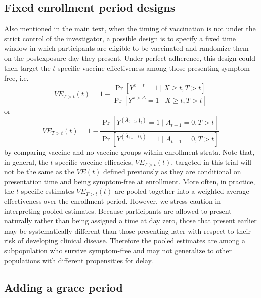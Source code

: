 \begin{appendices}
\begin{refsection}
    \subsection{Fixed enrollment period designs} \label{sec:enrollment}

    Also mentioned in the main text, when the timing of vaccination is not under the strict control of the investigator, a possible design is to specify a fixed time window in which participants are eligible to be vaccinated and randomize them on the postexposure day they present. Under perfect adherence, this design could then target the $t$-specific vaccine effectiveness among those presenting symptom-free, i.e.
    $$
    VE_{T > t}(t) = 1 - \frac{\Pr[Y^{x = t} = 1 \mid X \geq t, T > t]}{\Pr[Y^{x > \Delta} = 1 \mid X \geq t, T > t]}
    $$
    or 
    $$VE_{T > t}(t) = 1 - \dfrac{\Pr[Y^{(\overline{A}_{t-1}, \underline{1}_{t})} = 1\mid \overline{A}_{t-1} = 0, T > t]}{\Pr[Y^{(\overline{A}_{t-1}, \underline{0}_{t})} = 1\mid \overline{A}_{t-1} = 0, T > t]}$$
    by comparing vaccine and no vaccine groups within enrollment strata. Note that, in general, the $t$-specific vaccine efficacies, $VE_{T > t}(t)$, targeted in this trial will not be the same as the $VE(t)$ defined previously as they are conditional on presentation time and being symptom-free at enrollment. More often, in practice, the $t$-specific estimates $VE_{T > t}(t)$ are pooled together into a weighted average effectiveness over the enrollment period. However, we stress caution in interpreting pooled estimates. Because participants are allowed to present naturally rather than being assigned a time at day zero, those that present earlier may be systematically different than those presenting later with respect to their risk of developing clinical disease. Therefore the pooled estimates are among a subpopulation who survive symptom-free and may not generalize to other populations with different propensities for delay. 
    \clearpage 
    \subsection{Adding a grace period} \label{sec:graceperiod}


\end{refsection}
\end{appendices}
